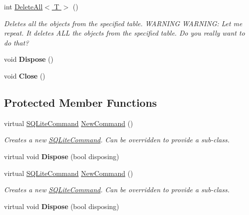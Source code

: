 \begin{DoxyCompactItemize}
int \hyperlink{classSQLite_1_1SQLiteConnection_abed406a2cd17e1e360b79924a749b67c}{Delete\-All$<$ T $>$} ()
\begin{DoxyCompactList}\small\item\em Deletes all the objects from the specified table. W\-A\-R\-N\-I\-N\-G W\-A\-R\-N\-I\-N\-G\-: Let me repeat. It deletes A\-L\-L the objects from the specified table. Do you really want to do that? \end{DoxyCompactList}\item 
\hypertarget{classSQLite_1_1SQLiteConnection_ad9e1e281245e83dbe9c5303eaefe95f6}{void {\bfseries Dispose} ()}\label{classSQLite_1_1SQLiteConnection_ad9e1e281245e83dbe9c5303eaefe95f6}

\item 
\hypertarget{classSQLite_1_1SQLiteConnection_a74160304a4a218b7508220106eeb10d0}{void {\bfseries Close} ()}\label{classSQLite_1_1SQLiteConnection_a74160304a4a218b7508220106eeb10d0}

\end{DoxyCompactItemize}
\subsection*{Protected Member Functions}
\begin{DoxyCompactItemize}
\item 
virtual \hyperlink{classSQLite_1_1SQLiteCommand}{S\-Q\-Lite\-Command} \hyperlink{classSQLite_1_1SQLiteConnection_a7535db6cca83fcde078fa4340b32e982}{New\-Command} ()
\begin{DoxyCompactList}\small\item\em Creates a new \hyperlink{classSQLite_1_1SQLiteCommand}{S\-Q\-Lite\-Command}. Can be overridden to provide a sub-\/class. \end{DoxyCompactList}\item 
\hypertarget{classSQLite_1_1SQLiteConnection_ab5e33e84b34867c48d1578d2890ff7e7}{virtual void {\bfseries Dispose} (bool disposing)}\label{classSQLite_1_1SQLiteConnection_ab5e33e84b34867c48d1578d2890ff7e7}

\item 
virtual \hyperlink{classSQLite_1_1SQLiteCommand}{S\-Q\-Lite\-Command} \hyperlink{classSQLite_1_1SQLiteConnection_a7535db6cca83fcde078fa4340b32e982}{New\-Command} ()
\begin{DoxyCompactList}\small\item\em Creates a new \hyperlink{classSQLite_1_1SQLiteCommand}{S\-Q\-Lite\-Command}. Can be overridden to provide a sub-\/class. \end{DoxyCompactList}\item 
\hypertarget{classSQLite_1_1SQLiteConnection_ab5e33e84b34867c48d1578d2890ff7e7}{virtual void {\bfseries Dispose} (bool disposing)}\label{classSQLite_1_1SQLiteConnection_ab5e33e84b34867c48d1578d2890ff7e7}

\end{DoxyCompactItemize}
